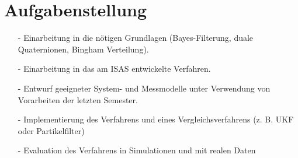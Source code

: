 \clearpage
\section{Aufgabenstellung}
\begin{itemize}
    \item[-]Einarbeitung in die nötigen Grundlagen (Bayes-Filterung, duale Quaternionen, Bingham Verteilung).
    \item[-]Einarbeitung in das am ISAS entwickelte Verfahren.
    \item[-]Entwurf geeigneter System- und Messmodelle unter Verwendung von Vorarbeiten der letzten Semester.
    \item[-]Implementierung des Verfahrens und eines Vergleichsverfahrens (z. B. UKF oder Partikelfilter)
    \item[-]Evaluation des Verfahrens in Simulationen und mit realen Daten
\end{itemize}




\clearpage